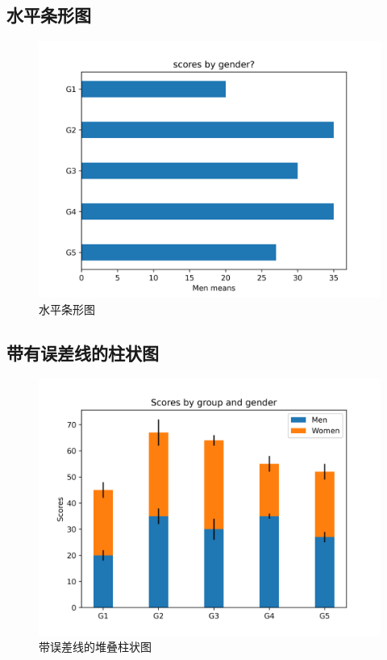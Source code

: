 \documentclass[openany]{progbookcn}
\begin{document}
\subsection{水平条形图}

\begin{figure}[H]
\centering
\includegraphics[width=0.6 \textwidth]{figs/chapter24/bars/HorizontalBar}
\caption{水平条形图}
\end{figure}

\subsection{带有误差线的柱状图}

\begin{figure}[H]
\centering
\includegraphics[width=0.6 \textwidth]{figs/chapter24/bars/StackedBar}
\caption{带误差线的堆叠柱状图}
\end{figure}
\end{document}
